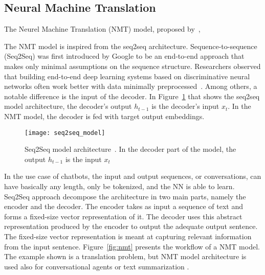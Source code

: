 \subsection{Neural Machine Translation}
The Neurel Machine Translation (NMT) model, proposed by~\citet{nmt-phd},

The NMT model is inspired from the seq2seq architecture. Sequence-to-sequence (Seq2Seq) was first introduced by Google \citep{1409.3215} to be an end-to-end approach that makes only minimal assumptions on the sequence structure. Researchers observed that building end-to-end deep learning systems based on discriminative neural networks often work better with data minimally preprocessed~\citep{chen2015handbook}.  Among others, a notable difference is the input of the decoder. In Figure~\ref{fig:seq2seqmodel} that shows the seq2seq model architecture, the decoder's output $h_{t-1}$ is the decoder's input $x_{t}$. In the NMT model, the decoder is fed with target output embeddings.


\begin{figure}
    \centering
    \texttt{[image: seq2seq\_model]}
    \caption[Seq2Seq model architecture]{Seq2Seq model architecture~\citep{1409.3215}. In the decoder part of the model, the output $h_{t-1}$ is the input $x_{t}$}
    \label{fig:seq2seqmodel}
\end{figure}

In the use case of chatbots, the input and output sequences, or conversations, can have basically any length, only be tokenized, and the NN is able to learn. Seq2Seq approach decompose the architecture in two main parts, namely the encoder and the decoder. The encoder takes as input a sequence of text and forms a fixed-size vector representation of it. The decoder uses this abstract representation produced by the encoder to output the adequate output sentence. The fixed-size vector representation is meant at capturing relevant information from the input sentence. Figure~\ref{fig:nmt} presents the workflow of a NMT model. The example shown is a translation problem, but NMT model architecture is used also for conversational agents or text summarization \citep{tensorflow.nmt}.

